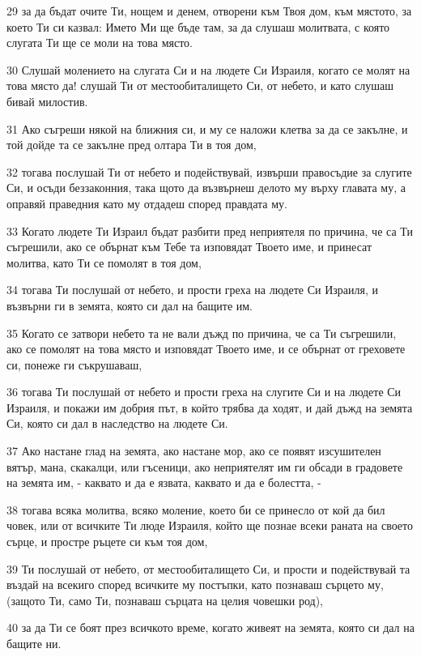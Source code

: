 \par 29 за да бъдат очите Ти, нощем и денем, отворени към Твоя дом, към мястото, за което Ти си казвал: Името Ми ще бъде там, за да слушаш молитвата, с която слугата Ти ще се моли на това място.
\par 30 Слушай молението на слугата Си и на людете Си Израиля, когато се молят на това място да! слушай Ти от местообиталището Си, от небето, и като слушаш бивай милостив.
\par 31 Ако съгреши някой на ближния си, и му се наложи клетва за да се закълне, и той дойде та се закълне пред олтара Ти в тоя дом,
\par 32 тогава послушай Ти от небето и подействувай, извърши правосъдие за слугите Си, и осъди беззаконния, така щото да възвърнеш делото му върху главата му, а оправяй праведния като му отдадеш според правдата му.
\par 33 Когато людете Ти Израил бъдат разбити пред неприятеля по причина, че са Ти съгрешили, ако се обърнат към Тебе та изповядат Твоето име, и принесат молитва, като Ти се помолят в тоя дом,
\par 34 тогава Ти послушай от небето, и прости греха на людете Си Израиля, и възвърни ги в земята, която си дал на бащите им.
\par 35 Когато се затвори небето та не вали дъжд по причина, че са Ти съгрешили, ако се помолят на това място и изповядат Твоето име, и се обърнат от греховете си, понеже ги съкрушаваш,
\par 36 тогава Ти послушай от небето и прости греха на слугите Си и на людете Си Израиля, и покажи им добрия път, в който трябва да ходят, и дай дъжд на земята Си, която си дал в наследство на людете Си.
\par 37 Ако настане глад на земята, ако настане мор, ако се появят изсушителен вятър, мана, скакалци, или гъсеници, ако неприятелят им ги обсади в градовете на земята им, - каквато и да е язвата, каквато и да е болестта, -
\par 38 тогава всяка молитва, всяко моление, което би се принесло от кой да бил човек, или от всичките Ти люде Израиля, който ще познае всеки раната на своето сърце, и простре ръцете си към тоя дом,
\par 39 Ти послушай от небето, от местообиталището Си, и прости и подействувай та въздай на всекиго според всичките му постъпки, като познаваш сърцето му, (защото Ти, само Ти, познаваш сърцата на целия човешки род),
\par 40 за да Ти се боят през всичкото време, когато живеят на земята, която си дал на бащите ни.
